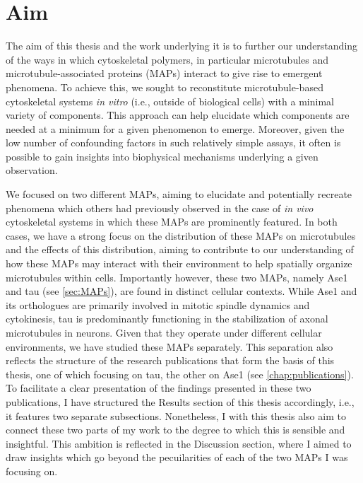 \chapter{Aim}
The aim of this thesis and the work underlying it is to further our understanding of the ways in which cytoskeletal polymers, in particular microtubules and microtubule-associated proteins (MAPs) interact to give rise to emergent phenomena. To achieve this, we sought to reconstitute microtubule-based cytoskeletal systems \textit{in vitro} (i.e., outside of biological cells) with a minimal variety of components. This approach can help elucidate which components are needed at a minimum for a given phenomenon to emerge. Moreover, given the low number of confounding factors in such relatively simple assays, it often is possible to gain insights into biophysical mechanisms underlying a given observation. \par
We focused on two different MAPs, aiming to elucidate and potentially recreate phenomena which others had previously observed in the case of \textit{in vivo} cytoskeletal systems in which these MAPs are prominently featured. In both cases, we have a strong focus on the distribution of these MAPs on microtubules and the effects of this distribution, aiming to contribute to our understanding of how these MAPs may interact with their environment to help spatially organize microtubules within cells. Importantly however, these two MAPs, namely Ase1 and tau (see \autoref{sec:MAPs}), are found in distinct cellular contexts. While Ase1 and its orthologues are primarily involved in mitotic spindle dynamics and cytokinesis, tau is predominantly functioning in the stabilization of axonal microtubules in neurons. Given that they operate under different cellular environments, we have studied these MAPs separately. This separation also reflects the structure of the research publications that form the basis of this thesis, one of which focusing on tau, the other on Ase1 (see \autoref{chap:publications}). To facilitate a clear presentation of the findings presented in these two publications, I have structured the Results section of this thesis accordingly, i.e., it features two separate subsections. Nonetheless, I with this thesis also aim to connect these two parts of my work to the degree to which this is sensible and insightful. This ambition is reflected in the Discussion section, where I aimed to draw insights which go beyond the pecuilarities of each of the two MAPs I was focusing on.